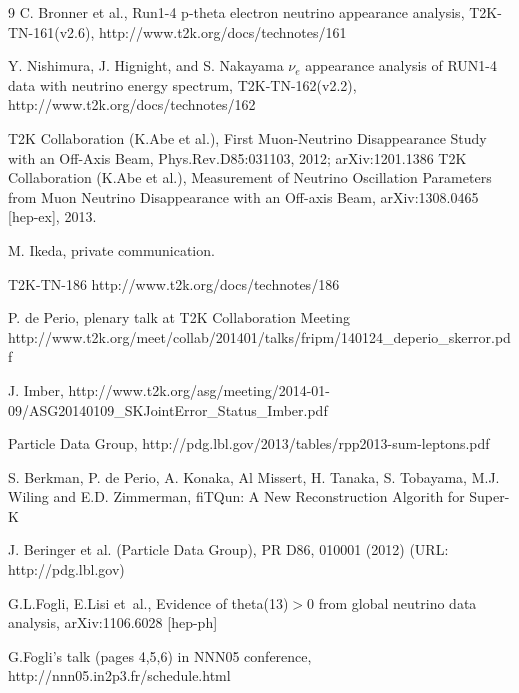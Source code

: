 \begin{thebibliography}{9}
  C. Bronner et al.,
  Run1-4 p-theta electron neutrino appearance analysis,
  T2K-TN-161(v2.6),
  http://www.t2k.org/docs/technotes/161

  Y. Nishimura, J. Hignight, and S. Nakayama
  $\nu_e$ appearance analysis of RUN1-4 data with neutrino energy spectrum,
  T2K-TN-162(v2.2),
  http://www.t2k.org/docs/technotes/162



%
%
   T2K Collaboration (K.Abe et al.), 
   First Muon-Neutrino Disappearance Study with an Off-Axis Beam,
   Phys.Rev.D85:031103, 2012; arXiv:1201.1386
  T2K Collaboration (K.Abe et al.),
  Measurement of Neutrino Oscillation Parameters from Muon Neutrino Disappearance with an Off-axis Beam,
  arXiv:1308.0465 [hep-ex], 2013.
  

%
%




%
%

M. Ikeda, 
private communication.

T2K-TN-186
http://www.t2k.org/docs/technotes/186

P. de Perio, plenary talk at T2K Collaboration Meeting
http://www.t2k.org/meet/collab/201401/talks/fripm/140124\_deperio\_skerror.pdf

J. Imber,
http://www.t2k.org/asg/meeting/2014-01-09/ASG20140109\_SKJointError\_Status\_Imber.pdf


Particle Data Group,
http://pdg.lbl.gov/2013/tables/rpp2013-sum-leptons.pdf

S. Berkman, P. de Perio, A. Konaka, Al Missert, H. Tanaka, S. Tobayama, M.J. Wiling and E.D. Zimmerman,
fiTQun: A New Reconstruction Algorith for Super-K

%
%

  J. Beringer et al. (Particle Data Group), 
  PR D86, 010001 (2012) (URL: http://pdg.lbl.gov)

  G.L.Fogli, E.Lisi et~al.,
  Evidence of theta(13)$>$0 from global neutrino data analysis,
  arXiv:1106.6028 [hep-ph]

 G.Fogli's talk (pages 4,5,6) in NNN05 conference,
 http://nnn05.in2p3.fr/schedule.html


\end{thebibliography}
